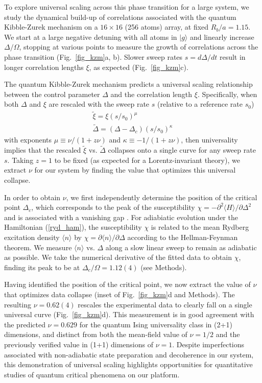\documentclass[reprint,twocolumn,secnumarabic,amssymb, aps, prl]{revtex4-1}
\begin{document}
To explore universal scaling across this phase transition for a large system, we study the dynamical build-up of correlations associated with the quantum Kibble-Zurek mechanism \cite{QKZM2005, Keesling2019} on a $16\times16$ (256 atoms) array,  at fixed $R_b/a = 1.15$. We start at a large negative detuning with all atoms in $|g\rangle$ and linearly increase $\Delta/\Omega$, stopping at various points to measure the growth of correlations across the phase transition (Fig.~\ref{fig_kzm}a, b). Slower sweep rates $s=d\Delta/dt$ result in longer correlation lengths $\xi$, as expected (Fig.~\ref{fig_kzm}c).
 
The quantum Kibble-Zurek mechanism predicts a universal scaling relationship between the control parameter $\Delta$ and the correlation length $\xi$. Specifically, when both $\Delta$ and $\xi$ are rescaled with the sweep rate $s$ (relative to a reference rate $s_0$)  
\begin{gather}
\tilde{\xi}=\xi(s/s_0)^\mu\\
\tilde{\Delta}=(\Delta-\Delta_c)(s/s_0)^\kappa 
\label{kz_rescale}
\end{gather}
with exponents $\mu \equiv \nu/(1+z\nu)$ and $\kappa \equiv -1/(1+z\nu)$, then universality implies that the rescaled $\tilde{\xi}$ vs. $\tilde{\Delta}$ collapses onto a single curve \cite{Keesling2019} for any sweep rate $s$. Taking $z=1$ to be fixed (as expected for a Lorentz-invariant theory), we extract $\nu$ for our system by finding the value that optimizes this universal collapse.

In order to obtain $\nu$, we first independently determine the position of the critical point $\Delta_c$, which corresponds to the peak of the susceptibility $\chi = - \partial^2 \langle H \rangle /\partial\Delta^2$ and is associated with a vanishing gap \cite{SachdevQPT}.
For adiabiatic evolution under the Hamiltonian (\ref{ryd_ham}), the susceptibility $\chi$ is related to the mean Rydberg excitation density $\langle n \rangle$ by $\chi = \partial \langle  n \rangle / \partial \Delta$ according to the Hellman-Feynman theorem. We measure $\langle n \rangle$ vs. $\Delta$ along a slow linear sweep to remain as adiabatic as possible. We take the numerical derivative of the fitted data to obtain $\chi$, finding its peak to be at $\Delta_c/\Omega = 1.12(4)$  (see Methods). 

Having identified the position of the critical point, we now extract the value of $\nu$ that optimizes data collapse (inset of Fig.~\ref{fig_kzm}d and Methods). The resulting $\nu =0.62(4)$ rescales the experimental data to clearly fall on a single universal curve (Fig.~\ref{fig_kzm}d). This measurement is in good agreement with the predicted $\nu = 0.629$ for the quantum Ising universality class in (2+1) dimensions\cite{Rhine2020}, and distinct from both the mean-field value\cite{SachdevQPT} of $\nu = 1/2$ and the previously verified value in (1+1) dimensions \cite{Keesling2019} of $\nu = 1$. Despite imperfections associated with non-adiabatic state preparation and decoherence in our system, this demonstration of universal scaling highlights opportunities for quantitative studies of quantum critical phenomena on our platform. 
\end{document}
